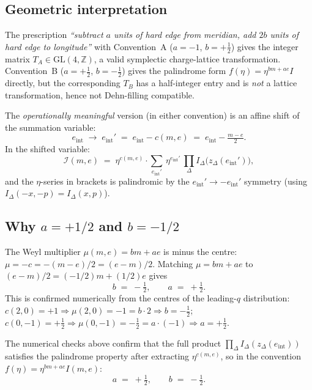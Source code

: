 \documentclass[12pt,a4paper]{article}
\newcommand{\IRef}{\mathcal{I}}
\newcommand{\IDelta}{I_\Delta}
\newcommand{\ZZ}{\mathbb{Z}}
\theoremstyle{definition}
\begin{document}
\subsection{Geometric interpretation}

The prescription \emph{``subtract $a$ units of hard edge from meridian,
add $2b$ units of hard edge to longitude''} with Convention~A
($a=-1$, $b=+\tfrac12$) gives the integer matrix $T_A \in \mathrm{GL}(4,\ZZ)$,
a valid symplectic charge-lattice transformation.
Convention~B ($a=+\tfrac12$, $b=-\tfrac12$) gives the palindrome form
$f(\eta)=\eta^{bm+ae}I$ directly, but the corresponding $T_B$
has a half-integer entry and is \emph{not} a lattice transformation,
hence not Dehn-filling compatible.

\medskip
The \emph{operationally meaningful} version (in either convention) is an
affine shift of the summation variable:
\[
  e_{\mathrm{int}} \;\longrightarrow\;
  e_{\mathrm{int}}' \;=\; e_{\mathrm{int}} - c(m,e)
  \;=\; e_{\mathrm{int}} - \tfrac{m-e}{2}.
\]
In the shifted variable:
\[
  \IRef(m,e) \;=\; \eta^{c(m,e)} \cdot
  \sum_{e_{\mathrm{int}}'}\, \eta^{e_{\mathrm{int}}'}\,
  \prod_\Delta \IDelta\!\bigl(z_\Delta(e_{\mathrm{int}}')\bigr),
\]
and the $\eta$-series in brackets is palindromic by the
$e_{\mathrm{int}}' \to -e_{\mathrm{int}}'$ symmetry
(using $\IDelta(-x,-p) = \IDelta(x,p)$).

\subsection{\texorpdfstring{Why $a=+1/2$ and $b=-1/2$}{Why a=+1/2 and b=-1/2}}

The Weyl multiplier $\mu(m,e)=bm+ae$ is minus the centre:
$\mu = -c = -(m-e)/2 = (e-m)/2$.
Matching $\mu = bm + ae$ to $(e-m)/2 = (-1/2)m + (1/2)e$ gives
\[
  b \;=\; -\tfrac12, \qquad a \;=\; +\tfrac12.
\]
This is confirmed numerically from the centres of the leading-$q$
distribution:
$c(2,0) = +1 \Rightarrow \mu(2,0)=-1 = b\cdot2 \Rightarrow b=-\tfrac12$;
$c(0,-1) = +\tfrac12 \Rightarrow \mu(0,-1)=-\tfrac12 = a\cdot(-1) \Rightarrow a=+\tfrac12$. \checkmark

The numerical checks above confirm that the full product
$\prod_\Delta I_\Delta(z_\Delta(e_{\mathrm{int}}))$
satisfies the palindrome property after extracting $\eta^{c(m,e)}$,
so in the convention $f(\eta)=\eta^{bm+ae}I(m,e)$:
\[
  \boxed{a \;=\; +\tfrac{1}{2}, \qquad b \;=\; -\tfrac{1}{2}.}
\]

\end{document}
